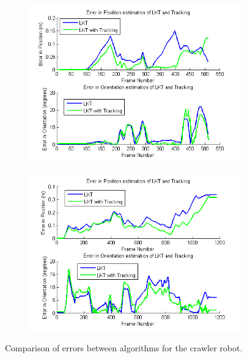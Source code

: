 \documentclass[letterpaper, 10 pt, conference]{ieeeconf}
\begin{document}
\begin{figure}[tb]
	\centering
	\begin{subfigure}{\columnwidth}
		  \centering
		  \includegraphics[width=\columnwidth]{crawler1_results.png}
		  \label{crawler:pattern1_error}
	\end{subfigure}
	\begin{subfigure}{\columnwidth}
		  \centering
		  \includegraphics[width=\columnwidth]{crawler2_results.png}
		  \label{crawler:pattern2_error}
	\end{subfigure}
	\caption{Comparison of errors between algorithms for the crawler robot.}
    \label{crawler_error}
\end{figure}
\end{document}
